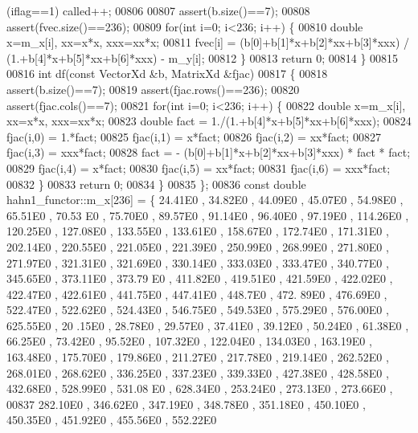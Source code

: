 \begin{DoxyCode}
{       (iflag==1) called++;}
00806 
00807         assert(b.size()==7);
00808         assert(fvec.size()==236);
00809         \textcolor{keywordflow}{for}(\textcolor{keywordtype}{int} i=0; i<236; i++) \{
00810             \textcolor{keywordtype}{double} x=m\_x[i], xx=x*x, xxx=xx*x;
00811             fvec[i] = (b[0]+b[1]*x+b[2]*xx+b[3]*xxx) / (1.+b[4]*x+b[5]*xx+b[6]*xxx) - m\_y[i];
00812         \}
00813         \textcolor{keywordflow}{return} 0;
00814     \}
00815 
00816     \textcolor{keywordtype}{int} df(\textcolor{keyword}{const} VectorXd &b, MatrixXd &fjac)
00817     \{
00818         assert(b.size()==7);
00819         assert(fjac.rows()==236);
00820         assert(fjac.cols()==7);
00821         \textcolor{keywordflow}{for}(\textcolor{keywordtype}{int} i=0; i<236; i++) \{
00822             \textcolor{keywordtype}{double} x=m\_x[i], xx=x*x, xxx=xx*x;
00823             \textcolor{keywordtype}{double} fact = 1./(1.+b[4]*x+b[5]*xx+b[6]*xxx);
00824             fjac(i,0) = 1.*fact;
00825             fjac(i,1) = x*fact;
00826             fjac(i,2) = xx*fact;
00827             fjac(i,3) = xxx*fact;
00828             fact = - (b[0]+b[1]*x+b[2]*xx+b[3]*xxx) * fact * fact;
00829             fjac(i,4) = x*fact;
00830             fjac(i,5) = xx*fact;
00831             fjac(i,6) = xxx*fact;
00832         \}
00833         \textcolor{keywordflow}{return} 0;
00834     \}
00835 \};
00836 \textcolor{keyword}{const} \textcolor{keywordtype}{double} hahn1\_functor::m\_x[236] = \{ 24.41E0 , 34.82E0 , 44.09E0 , 45.07E0 , 54.98E0 , 65.51E0 , 70.53
      E0 , 75.70E0 , 89.57E0 , 91.14E0 , 96.40E0 , 97.19E0 , 114.26E0 , 120.25E0 , 127.08E0 , 133.55E0 , 133.61E0 ,
       158.67E0 , 172.74E0 , 171.31E0 , 202.14E0 , 220.55E0 , 221.05E0 , 221.39E0 , 250.99E0 , 268.99E0 , 271.80E0
       , 271.97E0 , 321.31E0 , 321.69E0 , 330.14E0 , 333.03E0 , 333.47E0 , 340.77E0 , 345.65E0 , 373.11E0 , 373.79
      E0 , 411.82E0 , 419.51E0 , 421.59E0 , 422.02E0 , 422.47E0 , 422.61E0 , 441.75E0 , 447.41E0 , 448.7E0  , 472.
      89E0 , 476.69E0 , 522.47E0 , 522.62E0 , 524.43E0 , 546.75E0 , 549.53E0 , 575.29E0 , 576.00E0 , 625.55E0 , 20
      .15E0 , 28.78E0 , 29.57E0 , 37.41E0 , 39.12E0 , 50.24E0 , 61.38E0 , 66.25E0 , 73.42E0 , 95.52E0 , 107.32E0 ,
       122.04E0 , 134.03E0 , 163.19E0 , 163.48E0 , 175.70E0 , 179.86E0 , 211.27E0 , 217.78E0 , 219.14E0 , 262.52E0
       , 268.01E0 , 268.62E0 , 336.25E0 , 337.23E0 , 339.33E0 , 427.38E0 , 428.58E0 , 432.68E0 , 528.99E0 , 531.08
      E0 , 628.34E0 , 253.24E0 , 273.13E0 , 273.66E0 ,
00837 282.10E0 , 346.62E0 , 347.19E0 , 348.78E0 , 351.18E0 , 450.10E0 , 450.35E0 , 451.92E0 , 455.56E0 , 552.22E0

\end{DoxyCode}
